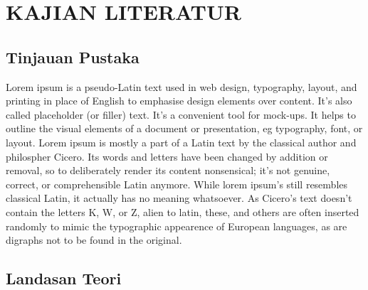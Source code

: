 
\chapter{KAJIAN LITERATUR}                

\section{Tinjauan Pustaka}
  Lorem ipsum is a pseudo-Latin text used in web design, typography, layout, and printing in place of English to emphasise design elements over content. It's also called placeholder (or filler) text. It's a convenient tool for mock-ups. It helps to outline the visual elements of a document or presentation, eg typography, font, or layout. Lorem ipsum is mostly a part of a Latin text by the classical author and philospher Cicero. Its words and letters have been changed by addition or removal, so to deliberately render its content nonsensical; it's not genuine, correct, or comprehensible Latin anymore. While lorem ipsum's still resembles classical Latin, it actually has no meaning whatsoever. As Cicero's text doesn't contain the letters K, W, or Z, alien to latin, these, and others are often inserted randomly to mimic the typographic appearence of European languages, as are digraphs not to be found in the original.

\section{Landasan Teori}
 \blindtext[2]
\begin{comment}

\end{comment}
